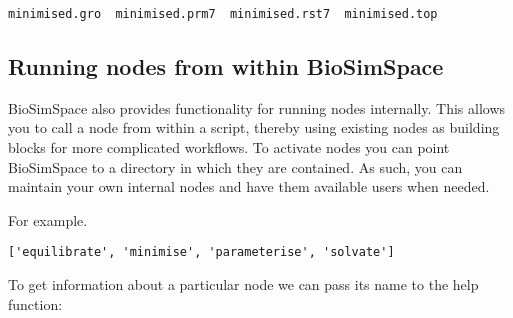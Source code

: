 \begin{Shaded}
\begin{Highlighting}[]
\OperatorTok{*}
\end{Highlighting}
\end{Shaded}

\begin{verbatim}
minimised.gro  minimised.prm7  minimised.rst7  minimised.top
\end{verbatim}

\hypertarget{running-nodes-from-within-biosimspace}{%
\subsection{Running nodes from within
BioSimSpace}\label{running-nodes-from-within-biosimspace}}

BioSimSpace also provides functionality for running nodes internally.
This allows you to call a node from within a script, thereby using
existing nodes as building blocks for more complicated workflows. To
activate nodes you can point BioSimSpace to a directory in which they
are contained. As such, you can maintain your own internal nodes and
have them available users when needed.

For example.

\begin{Shaded}
\begin{Highlighting}[]

\NormalTok{)}
\NormalTok{()}
\end{Highlighting}
\end{Shaded}

\begin{verbatim}
['equilibrate', 'minimise', 'parameterise', 'solvate']
\end{verbatim}

To get information about a particular node we can pass its name to the
help function:

\begin{Shaded}
\begin{Highlighting}[]
\NormalTok{(}\NormalTok{)}
\end{Highlighting}
\end{Shaded}

